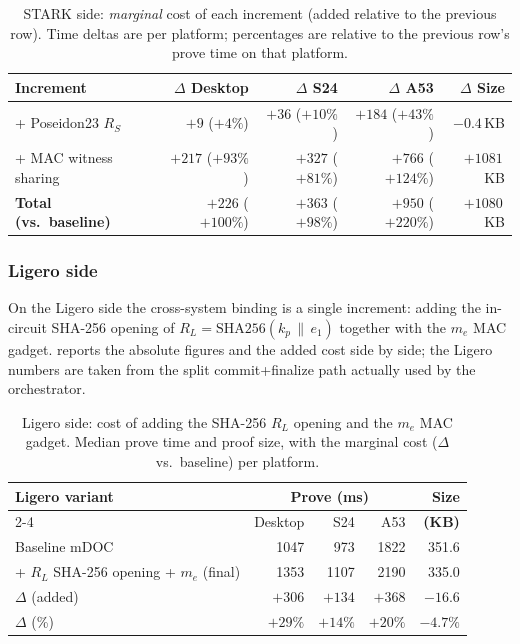 \documentclass{article}
\newcommand{\SHA}{\mathrm{SHA256}}
\begin{document}
\begin{table}[ht]
  \centering
  \caption{STARK side: \emph{marginal} cost of each increment (added relative to
  the previous row). Time deltas are per platform; percentages are relative to the
  previous row's prove time on that platform.}
  \label{tab:res-stark-delta}
  \small
  \begin{tabular}{@{}lrrrr@{}}
    \toprule
    \textbf{Increment} & \textbf{$\Delta$ Desktop} & \textbf{$\Delta$ S24} & \textbf{$\Delta$ A53} & \textbf{$\Delta$ Size} \\
    \midrule
    + Poseidon23 $R_S$        & $+9$ ($+4\%$)   & $+36$ ($+10\%$)  & $+184$ ($+43\%$)  & $-0.4$\,KB \\
    + MAC witness sharing     & $+217$ ($+93\%$)& $+327$ ($+81\%$) & $+766$ ($+124\%$) & $+1081$\,KB \\
    \midrule
    \textbf{Total (vs.\ baseline)} & $+226$ ($+100\%$) & $+363$ ($+98\%$) & $+950$ ($+220\%$) & $+1080$\,KB \\
    \bottomrule
  \end{tabular}
\end{table}

\subsubsection{Ligero side}
\label{results:cust-ligero}
On the Ligero side the cross-system binding is a single increment: adding the
in-circuit SHA-256 opening of $R_L=\SHA(k_p\,\|\,e_1)$ together with the $m_e$ MAC
gadget.  reports the absolute figures and the added
cost side by side; the Ligero numbers are taken from the split commit+finalize
path actually used by the orchestrator.

\begin{table}[ht]
  \centering
  \caption{Ligero side: cost of adding the SHA-256 $R_L$ opening and the $m_e$ MAC
  gadget. Median prove time and proof size, with the marginal cost
  ($\Delta$ vs.\ baseline) per platform.}
  \label{tab:res-ligero-steps}
  \small
  \begin{tabular}{@{}lrrrr@{}}
    \toprule
    \textbf{Ligero variant} & \multicolumn{3}{c}{\textbf{Prove (ms)}} & \textbf{Size} \\
    \cmidrule(lr){2-4}
     & Desktop & S24 & A53 & \textbf{(KB)} \\
    \midrule
    Baseline mDOC                                & 1047 & 973  & 1822 & 351.6 \\
    \;+ $R_L$ SHA-256 opening + $m_e$ (final)    & 1353 & 1107 & 2190 & 335.0 \\
    \midrule
    $\Delta$ (added)                             & $+306$ & $+134$ & $+368$ & $-16.6$ \\
    $\Delta$ (\%)                                & $+29\%$ & $+14\%$ & $+20\%$ & $-4.7\%$ \\
    \bottomrule
  \end{tabular}
\end{table}
\end{document}
